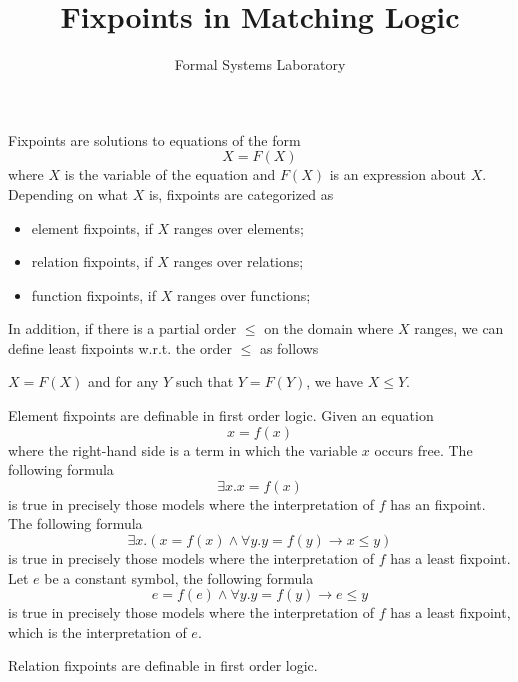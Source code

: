 \documentclass{article}
\title{Fixpoints in Matching Logic}
\author{Formal Systems Laboratory}
\begin{document}
\maketitle

Fixpoints are solutions to equations of the form
$$
X = F(X)
$$
where $X$ is the variable of the equation and $F(X)$ is an expression about $X$.
Depending on what $X$ is, fixpoints are categorized as
\begin{itemize}
	\item element fixpoints, if $X$ ranges over elements;
	\item relation fixpoints, if $X$ ranges over relations;
	\item function fixpoints, if $X$ ranges over functions;
\end{itemize}
In addition, if there is a partial order $\leq$ on the domain where $X$ ranges, 
we can define least fixpoints w.r.t. the order $\leq$ as follows
\begin{center}
	$X = F(X)$ and for any $Y$ such that $Y = F(Y)$, we have $X \leq Y$.
\end{center}

Element fixpoints are definable in first order logic.
Given an equation
$$
x = f(x)
$$
where the right-hand side is a term in which the variable $x$ occurs free.
The following formula
$$
\exists x . x = f(x)
$$
is true in precisely those models where the interpretation of $f$ has an
fixpoint.
The following formula
$$
\exists x . ( x = f(x) \wedge \forall y . y = f(y) \to x \le y )
$$
is true in precisely those models where the interpretation of $f$ has a least 
fixpoint.
Let $e$ be a constant symbol, the following formula
$$
 e = f(e) \wedge \forall y . y = f(y) \to e \le y 
$$
is true in precisely those models where the interpretation of $f$ has a least 
fixpoint, which is the interpretation of $e$.

Relation fixpoints are definable in first order logic.
\end{document}

